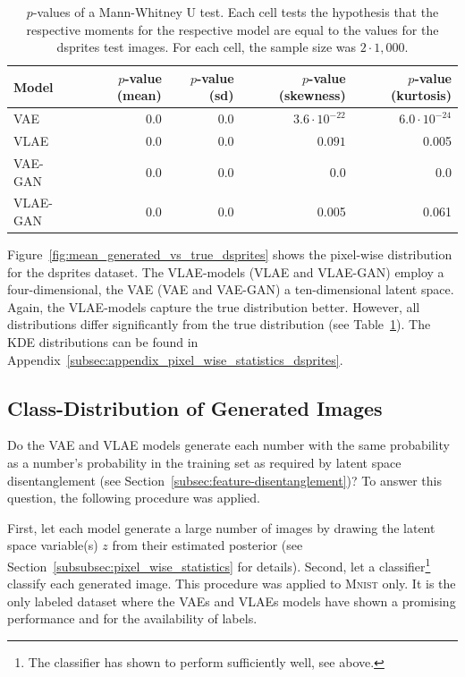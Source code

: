 \begin{table}
    \begin{tabular}{lrrrr}
        \toprule
        Model              & $p$-value (mean) & $p$-value (sd) & $p$-value (skewness) & $p$-value (kurtosis) \\
        \midrule
        \ac{VAE}           & $0.0$            & 0.0            & $3.6\cdot 10^{-22}$  & $6.0\cdot 10^{-24}$  \\
        \ac{VLAE}          & 0.0              & $0.0$          & $0.091$              & 0.005                \\
        \ac{VAE}-\ac{GAN}  & 0.0              & 0.0            & 0.0                  & 0.0                  \\
        \ac{VLAE}-\ac{GAN} & 0.0              & $0.0$          & 0.005                & 0.061                \\
        \bottomrule
    \end{tabular}
    \caption{$p$-values of a Mann-Whitney U test. Each cell tests the hypothesis that the respective moments for the respective model are equal to the values for the dsprites test images. For each cell, the sample size was $2\cdot 1,000$.}
    \label{tab:vae-vlae-dsprites}
\end{table}

Figure~\ref{fig:mean_generated_vs_true_dsprites} shows the pixel-wise distribution for the dsprites dataset.
The \ac{VLAE}-models (\ac{VLAE} and \ac{VLAE}-\ac{GAN}) employ a four-dimensional, the \ac{VAE} (\ac{VAE} and \ac{VAE}-\ac{GAN}) a ten-dimensional latent space.
Again, the \ac{VLAE}-models capture the true distribution better.
However, all distributions differ significantly from the true distribution (see Table~\ref{tab:vae-vlae-dsprites}).
The \ac{KDE} distributions can be found in Appendix~\ref{subsec:appendix_pixel_wise_statistics_dsprites}.

\subsection{Class-Distribution of Generated Images}\label{subsec:class-distribution-of-generated-images}

Do the \ac{VAE} and \ac{VLAE} models generate each number with the same probability as a number's probability in the training set as required by latent space disentanglement (see Section~\ref{subsec:feature-disentanglement})?
To answer this question, the following procedure was applied.

First, let each model generate a large number of images by drawing the latent space variable(s) $z$ from their estimated posterior (see Section~\ref{subsubsec:pixel_wise_statistics} for details).
Second, let a classifier\footnote{The classifier has shown to perform sufficiently well, see above.} classify each generated image.
This procedure was applied to \textsc{Mnist} only.
It is the only labeled dataset where the \acp{VAE} and \acp{VLAE} models have shown a promising performance and for the availability of labels.

